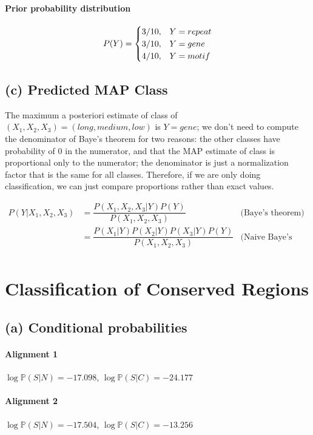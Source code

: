 \documentclass[11pt]{article}
\begin{document}
\paragraph{Prior probability distribution}
\[
P(Y) = 
\begin{cases}
    $3/10$, & Y = repeat \\
    $3/10$, & Y = gene \\
    $4/10$, & Y = motif \\
\end{cases}
\]

\subsection*{(c) Predicted MAP Class}

The maximum a posteriori estimate of class of
$(X_1, X_2, X_3) = (long, medium, low)$ is $Y = gene$;
we don't need to compute the denominator of 
Baye's theorem for two reasons: the other classes have
probability of $0$ in the numerator, and that the
MAP estimate of class is proportional only to the
numerator; the denominator is just a normalization
factor that is the same for all classes. Therefore, 
if we are only doing classification, we can just
compare proportions rather than exact values.

\begin{align*}
P(Y | X_1, X_2, X_3)
&= \dfrac{P(X_1, X_2, X_3 | Y)P(Y)}{P(X_1, X_2, X_3)}
& \text{(Baye's theorem)}\\
&= \dfrac{P(X_1 | Y)P(X_2 | Y)P(X_3 | Y)P(Y)}{P(X_1, X_2, X_3)}
& \text{(Naive Baye's assumption)}\\
\end{align*}

\section{Classification of Conserved Regions}
\subsection*{(a) Conditional probabilities}
\paragraph{Alignment 1}
$\log \mathbb{P}(S | N) = -17.098$,
$\log \mathbb{P}(S | C) = -24.177$

\paragraph{Alignment 2}
$\log \mathbb{P}(S | N) = -17.504$, 
$\log \mathbb{P}(S | C) = -13.256$
\end{document}
